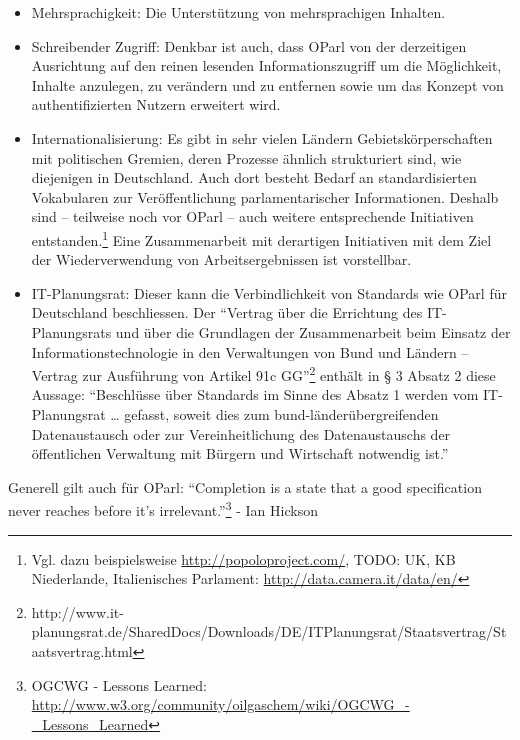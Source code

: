 \documentclass[,a4paper]{article}
\begin{document}
\begin{itemize}
  Standards verwenden. Deshalb werden entsprechende
  Standardisierungsvorhaben wie Linked Data Platform Paging\footnote{https://dvcs.w3.org/hg/ldpwg/raw-file/default/ldp-paging.html}
  des W3C und das Hydra Core Vocabulary\footnote{http://hydra-cg.com/spec/latest/core/\#collections}
  beobachtet.
\item
  Mehrsprachigkeit: Die Unterstützung von mehrsprachigen Inhalten.
\item
  Schreibender Zugriff: Denkbar ist auch, dass OParl von der derzeitigen
  Ausrichtung auf den reinen lesenden Informationszugriff um die
  Möglichkeit, Inhalte anzulegen, zu verändern und zu entfernen sowie um
  das Konzept von authentifizierten Nutzern erweitert wird.
\item
  Internationalisierung: Es gibt in sehr vielen Ländern
  Gebietskörperschaften mit politischen Gremien, deren Prozesse ähnlich
  strukturiert sind, wie diejenigen in Deutschland. Auch dort besteht
  Bedarf an standardisierten Vokabularen zur Veröffentlichung
  parlamentarischer Informationen. Deshalb sind -- teilweise noch vor
  OParl -- auch weitere entsprechende Initiativen entstanden.\footnote{Vgl.
    dazu beispielsweise \url{http://popoloproject.com/}, TODO: UK, KB
    Niederlande, Italienisches Parlament:
    \url{http://data.camera.it/data/en/}} Eine Zusammenarbeit mit
  derartigen Initiativen mit dem Ziel der Wiederverwendung von
  Arbeitsergebnissen ist vorstellbar.
\item
  IT-Planungsrat: Dieser kann die Verbindlichkeit von Standards wie
  OParl für Deutschland beschliessen. Der ``Vertrag über die Errichtung
  des IT-Planungsrats und über die Grundlagen der Zusammenarbeit beim
  Einsatz der Informationstechnologie in den Verwaltungen von Bund und
  Ländern -- Vertrag zur Ausführung von Artikel 91c GG''\footnote{http://www.it-planungsrat.de/SharedDocs/Downloads/DE/ITPlanungsrat/Staatsvertrag/Staatsvertrag.html}
  enthält in § 3 Absatz 2 diese Aussage: ``Beschlüsse über Standards im
  Sinne des Absatz 1 werden vom IT-Planungsrat \ldots{} gefasst, soweit
  dies zum bund-länderübergreifenden Datenaustausch oder zur
  Vereinheitlichung des Datenaustauschs der öffentlichen Verwaltung mit
  Bürgern und Wirtschaft notwendig ist.''
\end{itemize}

Generell gilt auch für OParl: ``Completion is a state that a good
specification never reaches before it's irrelevant.''\footnote{OGCWG -
  Lessons Learned:
  \url{http://www.w3.org/community/oilgaschem/wiki/OGCWG_-_Lessons_Learned}}
- Ian Hickson
\end{document}
